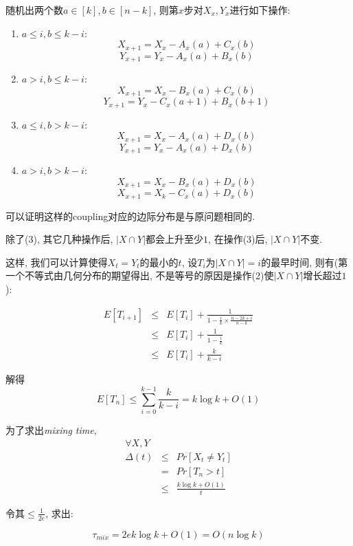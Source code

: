 \documentclass[paper=a4, fontsize=11pt]{scrartcl} %
\numberwithin{figure}{section} %
\numberwithin{table}{section} %
\begin{document}
\begin{enumerate}[(a)]
	随机出两个数$a\in[k], b\in[n-k]$, 则第$x$步对$X_x,Y_x$进行如下操作:
	\begin{enumerate}[(1)]
		\item $a \leq i, b \leq k - i$:
				$$X_{x+1} = X_{x} - A_{x}(a) + C_{x}(b)$$
				$$Y_{x+1} = Y_{x} - A_{x}(a) + B_{x}(b)$$
		\item $a > i, b \leq k - i$: 
				$$X_{x+1} = X_{x} - B_{x}(a) + C_{x}(b)$$
				$$Y_{x+1} = Y_{x} - C_{x}(a+1) + B_{x}(b+1)$$
		\item $a \leq i, b > k - i$:
				$$X_{x+1} = X_{x} - A_{x}(a) + D_{x}(b)$$
				$$Y_{x+1} = Y_{x} - A_{x}(a) + D_{x}(b)$$
		\item $a > i, b > k - i$: 
				$$X_{x+1} = X_{x} - B_{x}(a) + D_{x}(b)$$
				$$X_{x+1} = X_{k} - C_{x}(a) + D_{x}(b)$$
	\end{enumerate}

	可以证明这样的coupling对应的边际分布是与原问题相同的.

	除了(3), 其它几种操作后, $|X\cap Y|$都会上升至少$1$, 在操作(3)后, $|X\cap Y|$不变.

	这样, 我们可以计算使得$X_t = Y_t$的最小的$t$, 设$T_i$为$|X\cap Y| = i$的最早时间, 则有(第一个不等式由几何分布的期望得出, 不是等号的原因是操作(2)使$|X\cap Y|$增长超过$1$):

	\begin{eqnarray*}
		E[T_{i+1}] & \leq & E[T_{i}] + \frac{1}{1 - \frac{i}{k}\times\frac{n-2k+i}{n-k}} \\
				   & \leq & E[T_{i}] + \frac{1}{1 - \frac{i}{k}}\\
				   & \leq & E[T_{i}] + \frac{k}{k - i}
	\end{eqnarray*}

	解得$$E[T_n] \leq \sum_{i=0}^{k - 1} \frac{k}{k-i} = k \log k + O(1)$$

	为了求出\textit{mixing time}, 
	\begin{eqnarray*}
		\forall X, Y & & \\
		\Delta(t) 	& \leq & \textit{Pr}\left[
			X_t\not= Y_t
		\right]	 \\ 
		& = & \textit{Pr}\left[T_n > t\right] \\
		&\leq& \frac{k\log k + O(1)}{t} 
	\end{eqnarray*}

	令其$\leq\frac{1}{2e}$, 求出:

	$$\tau_{mix} = 2ek\log k + O(1) = O(n\log k)$$
\end{enumerate}
\end{document}
